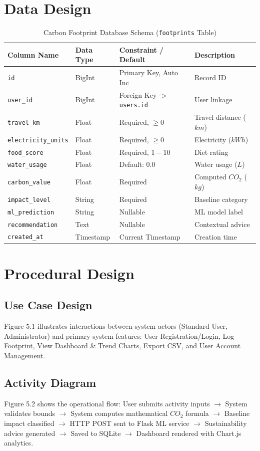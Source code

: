\documentclass[12pt,a4paper]{report}
\begin{document}
\section{Data Design}
\begin{table}[h]
\caption{Carbon Footprint Database Schema (\texttt{footprints} Table)}
\label{tab:schema}
\centering
\begin{tabular}{llll}
\toprule
\textbf{Column Name} & \textbf{Data Type} & \textbf{Constraint / Default} & \textbf{Description} \\
\midrule
\texttt{id} & BigInt & Primary Key, Auto Inc & Record ID \\
\texttt{user_id} & BigInt & Foreign Key -> \texttt{users.id} & User linkage \\
\texttt{travel_km} & Float & Required, $\ge 0$ & Travel distance ($km$) \\
\texttt{electricity_units} & Float & Required, $\ge 0$ & Electricity ($kWh$) \\
\texttt{food_score} & Float & Required, $1-10$ & Diet rating \\
\texttt{water_usage} & Float & Default: 0.0 & Water usage ($L$) \\
\texttt{carbon_value} & Float & Required & Computed $CO_2$ ($kg$) \\
\texttt{impact_level} & String & Required & Baseline category \\
\texttt{ml_prediction} & String & Nullable & ML model label \\
\texttt{recommendation} & Text & Nullable & Contextual advice \\
\texttt{created_at} & Timestamp & Current Timestamp & Creation time \\
\bottomrule
\end{tabular}
\end{table}

\section{Procedural Design}
\subsection{Use Case Design}
Figure 5.1 illustrates interactions between system actors (Standard User, Administrator) and primary system features: User Registration/Login, Log Footprint, View Dashboard \& Trend Charts, Export CSV, and User Account Management.

\subsection{Activity Diagram}
Figure 5.2 shows the operational flow: User submits activity inputs $\rightarrow$ System validates bounds $\rightarrow$ System computes mathematical $CO_2$ formula $\rightarrow$ Baseline impact classified $\rightarrow$ HTTP POST sent to Flask ML service $\rightarrow$ Sustainability advice generated $\rightarrow$ Saved to SQLite $\rightarrow$ Dashboard rendered with Chart.js analytics.
\end{document}
